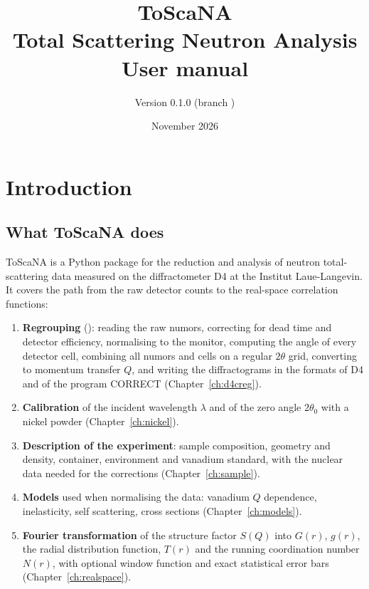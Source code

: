 \documentclass[11pt,a4paper]{report}
\title{\textbf{ToScaNA}\\[4pt]\Large Total Scattering Neutron Analysis\\[2pt]
\large User manual}
\author{Version 0.1.0 (branch \code{fixes/group-a})}
\date{November 2026}
\DeclareRobustCommand{\code}[1]{\path{#1}}
\begin{document}
\maketitle
\tableofcontents

\chapter{Introduction}

\section{What ToScaNA does}

ToScaNA is a Python package for the reduction and analysis of neutron
total-scattering data measured on the diffractometer D4 at the Institut
Laue-Langevin. It covers the path from the raw detector counts to the
real-space correlation functions:

\begin{enumerate}
  \item \textbf{Regrouping} (\code{d4creg}): reading the raw numors,
    correcting for dead time and detector efficiency, normalising to the
    monitor, computing the angle of every detector cell, combining all
    numors and cells on a regular $2\theta$ grid, converting to momentum
    transfer $Q$, and writing the diffractograms in the formats of D4 and of
    the program CORRECT (Chapter~\ref{ch:d4creg}).
  \item \textbf{Calibration} of the incident wavelength $\lambda$ and of the
    zero angle $2\theta_0$ with a nickel powder (Chapter~\ref{ch:nickel}).
  \item \textbf{Description of the experiment}: sample composition,
    geometry and density, container, environment and vanadium standard,
    with the nuclear data needed for the corrections
    (Chapter~\ref{ch:sample}).
  \item \textbf{Models} used when normalising the data: vanadium $Q$
    dependence, inelasticity, self scattering, cross sections
    (Chapter~\ref{ch:models}).
  \item \textbf{Fourier transformation} of the structure factor $S(Q)$ into
    $G(r)$, $g(r)$, the radial distribution function, $T(r)$ and the running
    coordination number $N(r)$, with optional window function and exact
    statistical error bars (Chapter~\ref{ch:realspace}).
\end{enumerate}
\end{document}
